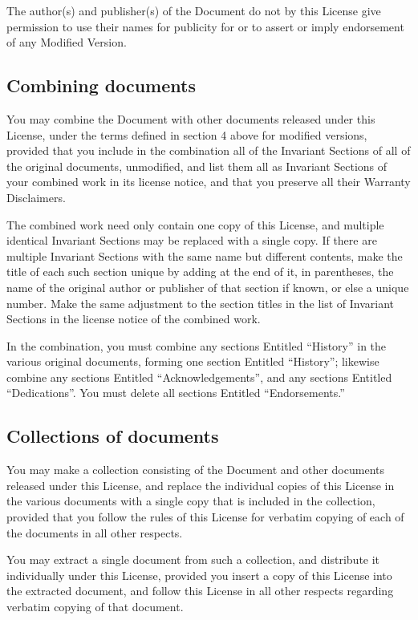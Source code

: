 The author(s) and publisher(s) of the Document do not by this License
give permission to use their names for publicity for or to assert
or imply endorsement of any Modified Version.


\subsection{Combining documents}

You may combine the Document with other documents released under this
License, under the terms defined in section 4 above for modified versions,
provided that you include in the combination all of the Invariant
Sections of all of the original documents, unmodified, and list them
all as Invariant Sections of your combined work in its license notice,
and that you preserve all their Warranty Disclaimers.

The combined work need only contain one copy of this License, and
multiple identical Invariant Sections may be replaced with a single
copy. If there are multiple Invariant Sections with the same name
but different contents, make the title of each such section unique
by adding at the end of it, in parentheses, the name of the original
author or publisher of that section if known, or else a unique number.
Make the same adjustment to the section titles in the list of Invariant
Sections in the license notice of the combined work.

In the combination, you must combine any sections Entitled ``History''
in the various original documents, forming one section Entitled ``History'';
likewise combine any sections Entitled ``Acknowledgements'', and any
sections Entitled ``Dedications''. You must delete all sections Entitled
``Endorsements.''


\subsection{Collections of documents}

You may make a collection consisting of the Document and other documents
released under this License, and replace the individual copies of
this License in the various documents with a single copy that is included
in the collection, provided that you follow the rules of this License
for verbatim copying of each of the documents in all other respects.

You may extract a single document from such a collection, and distribute
it individually under this License, provided you insert a copy of
this License into the extracted document, and follow this License
in all other respects regarding verbatim copying of that document.


